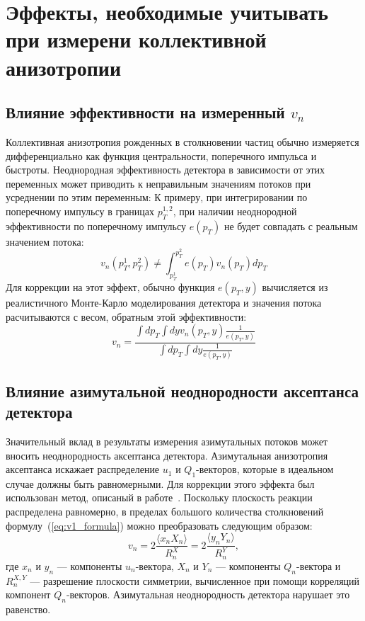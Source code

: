 \section{Эффекты, необходимые учитывать при измерени коллективной анизотропии}

\subsection{Влияние эффективности на измеренный $v_n$}

Коллективная анизотропия рожденных в столкновении частиц обычно измеряется дифференциально как функция центральности, поперечного импульса и быстроты.
Неоднородная эффективность детектора в зависимости от этих переменных может приводить к неправильным значениям потоков при усреднении по этим переменным:
К примеру, при интегрировании по поперечному импульсу в границах $p_T^{1,2}$, при наличии неоднородной эффективности по поперечному импульсу $e(p_T)$ не будет совпадать с реальным значением потока:
%
\begin{equation}
    v_n( p_T^{1}, p_T^{2} ) \ne \int_{p_T^1}^{p_T^2} e(p_T) v_n(p_T) dp_T 
    \label{eq:v1_formula}
\end{equation}
Для коррекции на этот эффект, обычно функция $e(p_T, y)$ вычисляется из реалистичного Монте-Карло моделирования детектора и значения потока расчитываются с весом, обратным этой эффективности:
%
\begin{equation}
    v_n = \frac{\int dp_T \int dy v_n(p_T, y) \frac{1}{e(p_T, y)} }{\int dp_T \int dy \frac{1}{e(p_T, y)} } 
    \label{eq:v1_formula}
\end{equation}

\subsection{Влияние азимутальной неоднородности аксептанса детектора}

Значительный вклад в результаты измерения азимутальных потоков может вносить неоднородность аксептанса детектора. 
Азимутальная анизотропия аксептанса искажает распределение $u_1$  и $Q_1$-векторов, которые в идеальном случае должны быть равномерными. 
Для коррекции этого эффекта был использован метод, описаный в работе~\cite{Selyuzhenkov:2007zi}.
Поскольку плоскость реакции распределена равномерно, в пределах большого количества столкновений формулу~(\ref{eq:v1_formula}) можно преобразовать следующим образом:
%
\begin{equation}
    v_n =  2\frac{ \langle x_n X_n \rangle }{R_n^X} = 2\frac{ \langle y_n Y_n \rangle }{R_n^Y},
    \label{eq:v1_formula}
\end{equation}
%
где $x_n$ и $y_n$ --- компоненты $u_n$-вектора, $X_n$ и $Y_n$ --- компоненты $Q_n$-вектора и $R_n^{X,Y}$ --- разрешение плоскости симметрии, вычисленное при помощи корреляций компонент $Q_n$-векторов.
Азимутальная неоднородность детектора нарушает это равенство.

